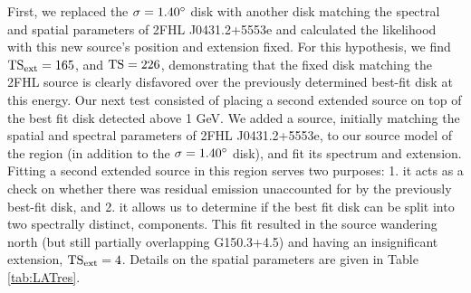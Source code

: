\documentclass[iop]{emulateapj}
\newcommand{\kibitz}[2]{\ifnum\Comments=1\textcolor{#1}{#2}\fi}
\newcommand{\jamie}[1]{\kibitz{red}      {[JAM: #1]}}
\newcommand{\Gone}{G150.3+4.5}
\newcommand{\ghard}{2FHL J0431.2+5553e}
\begin{document}
First, we  replaced the ${\rm \sigma = 1.40^{\circ}}$ disk with another disk matching the spectral and spatial parameters of \ghard{} and calculated the likelihood with this new source's position and extension fixed. For this hypothesis, we find ${\rm TS_{ext} =  165}$, and  ${\rm TS = 226}$, demonstrating that the fixed disk matching the 2FHL source is clearly disfavored over the previously determined best-fit disk at this energy. Our next test consisted of placing a second extended source on top of the best fit disk detected above 1 GeV. We added a source, initially matching the spatial and spectral parameters of \ghard{}, to our source model of the region (in addition to the ${\rm \sigma = 1.40^{\circ}}$ disk), and fit its spectrum and extension. Fitting a second extended source in this region serves two purposes: 1. it acts as a check on whether there was residual emission unaccounted for by the previously best-fit disk, and 2. it allows us to determine if the best fit disk can be split into two spectrally distinct, components. This fit resulted in the source wandering north (but still partially overlapping \Gone{}) and having an insignificant extension, ${\rm TS_{ext} =  4}$.
 Details on the spatial parameters are given in Table \ref{tab:LATres}.



\end{document}
